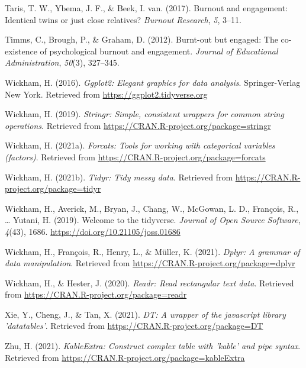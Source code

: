 \documentclass[
  english,
  man]{apa6}
\begin{document}
\leavevmode\hypertarget{ref-taris2017burnout}{}%
Taris, T. W., Ybema, J. F., \& Beek, I. van. (2017). Burnout and engagement: Identical twins or just close relatives? \emph{Burnout Research}, \emph{5}, 3--11.

\leavevmode\hypertarget{ref-timms2012burnt}{}%
Timms, C., Brough, P., \& Graham, D. (2012). Burnt-out but engaged: The co-existence of psychological burnout and engagement. \emph{Journal of Educational Administration}, \emph{50}(3), 327--345.

\leavevmode\hypertarget{ref-R-ggplot2}{}%
Wickham, H. (2016). \emph{Ggplot2: Elegant graphics for data analysis}. Springer-Verlag New York. Retrieved from \url{https://ggplot2.tidyverse.org}

\leavevmode\hypertarget{ref-R-stringr}{}%
Wickham, H. (2019). \emph{Stringr: Simple, consistent wrappers for common string operations}. Retrieved from \url{https://CRAN.R-project.org/package=stringr}

\leavevmode\hypertarget{ref-R-forcats}{}%
Wickham, H. (2021a). \emph{Forcats: Tools for working with categorical variables (factors)}. Retrieved from \url{https://CRAN.R-project.org/package=forcats}

\leavevmode\hypertarget{ref-R-tidyr}{}%
Wickham, H. (2021b). \emph{Tidyr: Tidy messy data}. Retrieved from \url{https://CRAN.R-project.org/package=tidyr}

\leavevmode\hypertarget{ref-R-tidyverse}{}%
Wickham, H., Averick, M., Bryan, J., Chang, W., McGowan, L. D., François, R., \ldots{} Yutani, H. (2019). Welcome to the tidyverse. \emph{Journal of Open Source Software}, \emph{4}(43), 1686. \url{https://doi.org/10.21105/joss.01686}

\leavevmode\hypertarget{ref-R-dplyr}{}%
Wickham, H., François, R., Henry, L., \& Müller, K. (2021). \emph{Dplyr: A grammar of data manipulation}. Retrieved from \url{https://CRAN.R-project.org/package=dplyr}

\leavevmode\hypertarget{ref-R-readr}{}%
Wickham, H., \& Hester, J. (2020). \emph{Readr: Read rectangular text data}. Retrieved from \url{https://CRAN.R-project.org/package=readr}

\leavevmode\hypertarget{ref-R-DT}{}%
Xie, Y., Cheng, J., \& Tan, X. (2021). \emph{DT: A wrapper of the javascript library 'datatables'}. Retrieved from \url{https://CRAN.R-project.org/package=DT}

\leavevmode\hypertarget{ref-R-kableExtra}{}%
Zhu, H. (2021). \emph{KableExtra: Construct complex table with 'kable' and pipe syntax}. Retrieved from \url{https://CRAN.R-project.org/package=kableExtra}

\endgroup
\end{document}
